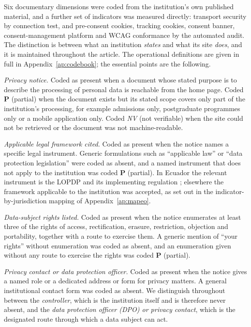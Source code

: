 \documentclass[]{interact}
\newcommand{\nv}{\textsl{\footnotesize NV}}
\begin{document}
Six documentary dimensions were coded from the institution's own published material, and a further set of indicators was measured directly: transport security by connection test, and pre-consent cookies, tracking cookies, consent banner, consent-management platform and WCAG conformance by the automated audit. The distinction is between what an institution \emph{states} and what its site \emph{does}, and it is maintained throughout the article. The operational definitions are given in full in Appendix~\ref{ap:codebook}; the essential points are the following.

\emph{Privacy notice.} Coded as present when a document whose stated purpose is to describe the processing of personal data is reachable from the home page. Coded \textbf{P} (partial) when the document exists but its stated scope covers only part of the institution's processing, for example admissions only, postgraduate programmes only or a mobile application only. Coded \nv{} (not verifiable) when the site could not be retrieved or the document was not machine-readable.

\emph{Applicable legal framework cited.} Coded as present when the notice names a specific legal instrument. Generic formulations such as ``applicable law'' or ``data protection legislation'' were coded as absent, and a named instrument that does not apply to the institution was coded \textbf{P} (partial). In Ecuador the relevant instrument is the LOPDP and its implementing regulation \citep{lopdp2021,reglamentolopdp2023}; elsewhere the framework applicable to the institution was accepted, as set out in the indicator-by-jurisdiction mapping of Appendix~\ref{ap:mapeo}.

\emph{Data-subject rights listed.} Coded as present when the notice enumerates at least three of the rights of access, rectification, erasure, restriction, objection and portability, together with a route to exercise them. A generic mention of ``your rights'' without enumeration was coded as absent, and an enumeration given without any route to exercise the rights was coded \textbf{P} (partial).

\emph{Privacy contact or data protection officer.} Coded as present when the notice gives a named role or a dedicated address or form for privacy matters. A general institutional contact form was coded as absent. We distinguish throughout between the \emph{controller}, which is the institution itself and is therefore never absent, and the \emph{data protection officer (DPO) or privacy contact}, which is the designated route through which a data subject can act.
\end{document}
